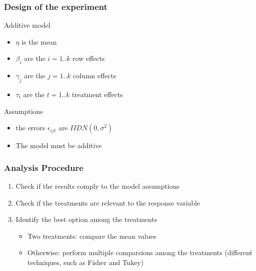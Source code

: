 \documentclass{beamer}
\begin{document}
\begin{frame}
\frametitle{Design of the experiment}
\begin{block}{Additive model}
\begin{scriptsize}
\begin{itemize}
  \item $\eta$ is the mean
  \item $\beta_i$ are the $i = 1 .. k$ row effects
  \item $\gamma_j$ are the $j = 1 .. k$ column effects
  \item $\tau_t$ are the $t = 1 .. k$ treatment effects
\end{itemize}
\end{scriptsize}
\end{block}

\begin{block}{Assumptions}
\begin{itemize}
  \item the errors $\epsilon_{ijt}$ are $IIDN(0,\sigma^2)$
  \item The model must be additive
\end{itemize}
\end{block}

\end{frame}

\begin{frame}
\frametitle{Analysis Procedure}
\begin{enumerate}
  \item Check if the results comply to the model assumptions
  \item Check if the treatments are relevant to the response variable
  \item Identify the best option among the treatments 
  \begin{itemize}
    \item Two treatments: compare the mean values
    \item Otherwise: perform multiple comparsions among the treatments
    (different techniques, such as Fisher and Tukey)
  \end{itemize}
\end{enumerate}
\end{frame}
\end{document}
